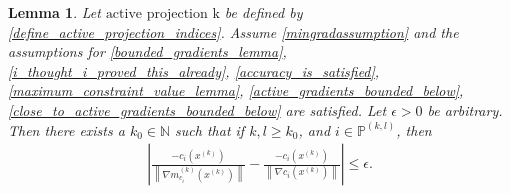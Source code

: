 \documentclass{article}
\newtheorem{lemma}[theorem]{Lemma}
\theoremstyle{case}
\numberwithin{theorem}{subsection}
\newcommand{\gmcik}{{\nabla m_{c_i}^{(k)}\left(\xk\right)}}
\newcommand{\naturals}{\mathbb N}
\newcommand{\xk}{x^{(k)}}
\newcommand{\activeprojkl}{{\mathbb P^{(k, l)}}}
\newcommand{\activeprojk}{{\textrm{active projection k}}}
\begin{document}
\begin{lemma}
\label{ziks_are_close_lemma}
Let $\activeprojk$ be defined by \cref{define_active_projection_indices}.
Assume 
\cref{mingradassumption} and the assumptions for
\cref{bounded_gradients_lemma},
\cref{i_thought_i_proved_this_already},
\cref{accuracy_is_satisfied},
\cref{maximum_constraint_value_lemma},
\cref{active_gradients_bounded_below},
\cref{close_to_active_gradients_bounded_below}
are satisfied.
Let $\epsilon > 0$ be arbitrary.
Then there exists a $k_0 \in \naturals$ such that if $k, l \ge k_0$, and $i \in \activeprojkl$,
then 
\begin{align*}
\left|\frac{-c_i\left(\xk \right)}{\left\|\gmcik\right\|} - \frac{-c_i\left(\xk \right)}{\left\|\nabla c_i\left(\xk \right)\right\|} \right| \le \epsilon.
\end{align*}
\end{lemma}
\end{document}
